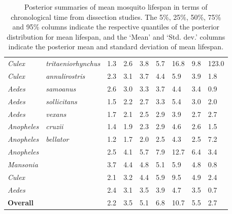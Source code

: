 \documentclass[12pt]{article}
\begin{document}
{\begin{table}[htbp]
\begin{tabular}{l|l|l|l|l|l|l|l|l}
		\textit{Culex} & \textit{tritaeniorhynchus} & 1.3 & 2.6 & 3.8 & 5.7 & 16.8 & 9.8 & 123.0 \\
		\textit{Culex} & \textit{annulirostris} & 2.3 & 3.1 & 3.7 & 4.4 & 5.9 & 3.9 & 1.8 \\
		\textit{Aedes} & \textit{samoanus} & 2.6 & 3.0 & 3.3 & 3.7 & 4.4 & 3.4 & 0.9 \\
		\textit{Aedes} & \textit{sollicitans} & 1.5 & 2.2 & 2.7 & 3.3 & 5.4 & 3.0 & 2.0 \\
		\textit{Aedes} & \textit{vexans} & 1.7 & 2.1 & 2.5 & 2.9 & 3.9 & 2.7 & 2.7 \\
		\textit{Anopheles} & \textit{cruzii} & 1.4 & 1.9 & 2.3 & 2.9 & 4.6 & 2.6 & 1.5 \\
		\textit{Anopheles} & \textit{bellator} & 1.2 & 1.7 & 2.0 & 2.5 & 4.3 & 2.5 & 7.2 \\
		\hline
		\textit{Anopheles} & \textit{} & 2.5 & 4.1 & 5.7 & 7.9 & 12.7 & 6.4 & 3.4 \\
		\textit{Mansonia} & \textit{} & 3.7 & 4.4 & 4.8 & 5.1 & 5.9 & 4.8 & 0.8 \\
		\textit{Culex} & \textit{} & 2.1 & 3.2 & 4.4 & 5.9 & 9.5 & 4.9 & 2.4 \\
		\textit{Aedes} & \textit{} & 2.4 & 3.1 & 3.5 & 3.9 & 4.7 & 3.5 & 0.7 \\
		\hline
		\textbf{Overall} & \textit{} & 2.2 & 3.5 & 5.1 & 6.8 & 10.7 & 5.5 & 2.7 \\
	\end{tabular}
\caption{Posterior summaries of mean mosquito lifespan in terms of chronological time from dissection studies. The 5\%, 25\%, 50\%, 75\% and 95\% columns indicate the respective quantiles of the posterior distribution for mean lifespan, and the `Mean' and `Std. dev.' columns indicate the posterior mean and standard deviation of mean lifespan.}
\label{tab:dissection_estimated_lifespans_chron}%
\end{table}

}
\end{document}
